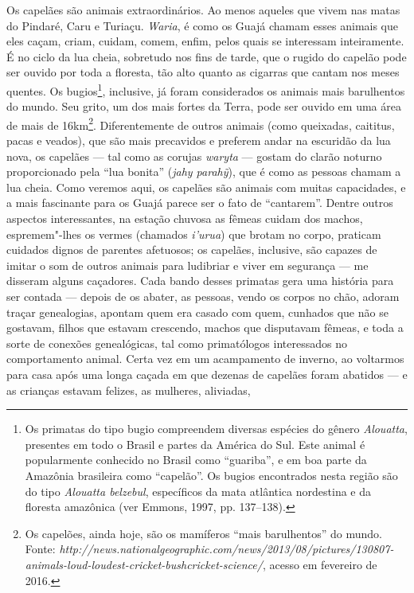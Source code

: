 Os capelães são animais extraordinários. Ao menos aqueles que vivem nas
matas do Pindaré, Caru e Turiaçu. \emph{Waria}, é como os Guajá chamam
esses animais que eles caçam, criam, cuidam, comem, enfim, pelos quais
se interessam inteiramente. É no ciclo da lua cheia, sobretudo nos fins
de tarde, que o rugido do capelão pode ser ouvido por toda a floresta,
tão alto quanto as cigarras que cantam nos meses quentes. Os
bugios\footnote{Os primatas do tipo bugio compreendem diversas espécies
  do gênero \emph{Alouatta}, presentes em todo o Brasil e partes da
  América do Sul. Este animal é popularmente conhecido no Brasil como
  ``guariba'', e em boa parte da Amazônia brasileira como ``capelão''.
  Os bugios encontrados nesta região são do tipo \emph{Alouatta
  belzebul}, específicos da mata atlântica nordestina e da floresta
  amazônica (ver Emmons, 1997, pp. 137--138).}, inclusive, já foram
considerados os animais mais barulhentos do mundo. Seu grito, um dos
mais fortes da Terra, pode ser ouvido em uma área de mais de
16km\footnote{Os capelões, ainda hoje, são os mamíferos ``mais
  barulhentos'' do mundo. Fonte:
  \emph{http://news.nationalgeographic.com/news/2013/08/pictures/130807-animals-loud-loudest-cricket-bushcricket-science/},
  acesso em fevereiro de 2016.}. Diferentemente de outros animais (como
queixadas, caititus, pacas e veados), que são mais precavidos e preferem
andar na escuridão da lua nova, os capelães --- tal como as corujas
\emph{waryta} --- gostam do clarão noturno proporcionado pela ``lua
bonita'' (\emph{jahy parahỹ}), que é como as pessoas chamam a lua cheia.
Como veremos aqui, os capelães são animais com muitas capacidades, e a
mais fascinante para os Guajá parece ser o fato de ``cantarem''. Dentre
outros aspectos interessantes, na estação chuvosa as fêmeas cuidam dos
machos, espremem"-lhes os vermes (chamados \emph{i'urua}) que brotam no
corpo, praticam cuidados dignos de parentes afetuosos; os capelães,
inclusive, são capazes de imitar o som de outros animais para ludibriar
e viver em segurança --- me disseram alguns caçadores. Cada bando desses
primatas gera uma história para ser contada --- depois de os abater, as
pessoas, vendo os corpos no chão, adoram traçar genealogias, apontam
quem era casado com quem, cunhados que não se gostavam, filhos que
estavam crescendo, machos que disputavam fêmeas, e toda a sorte de
conexões genealógicas, tal como primatólogos interessados no
comportamento animal. Certa vez em um acampamento de inverno, ao
voltarmos para casa após uma longa caçada em que dezenas de capelães
foram abatidos --- e as crianças estavam felizes, as mulheres, aliviadas,
